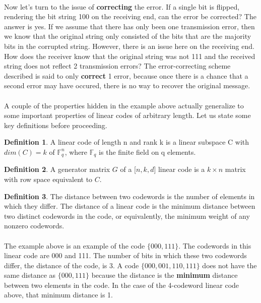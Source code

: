 \documentclass{article}
\theoremstyle{definition}
\newtheorem{definition}{Definition}[section]
\begin{document}
\paragraph{} Now let's turn to the issue of \textbf{correcting} the error.  If a single bit is flipped, rendering the bit string 100 on the receiving end, can the error be corrected?  The answer is yes.  If we assume that there has only been one transmission error, then we know that the original string only consisted of the bits that are the majority bits in the corrupted string.  However, there is an issue here on the receiving end.  How does the receiver know that the original string was not 111 and the received string does not reflect 2 transmission errors?  The error-correcting scheme described is said to only \textbf{correct} 1 error, because once there is a chance that a second error may have occured, there is no way to recover the original message. 
\paragraph{} A couple of the properties hidden in the example above actually generalize to some important properties of linear codes of arbitrary length.  Let us state some key definitions before proceeding.        

\begin{definition}
A linear code of length n and rank k is a linear subspace C with $dim(C)=k$ of $\mathbb{F}_{q}^{n}$, where $\mathbb{F}_{q}$ is the finite field on q elements. 
\end{definition}	
\begin{definition}
A generator matrix $G$ of a [$n,k,d$] linear code is a $k \times n$ matrix with row space equivalent to $C$.
\end{definition}
\begin{definition}
The distance between two codewords is the number of elements in which they differ.  The distance of a linear code is the minimum distance between two distinct codewords in the code, or equivalently, the minimum weight of any nonzero codewords.
\end{definition}

\paragraph{} The example above is an example of the code $\{000,111\}$.  The codewords in this linear code are 000 and 111.  The number of bits in which these two codewords differ, the distance of the code, is 3.  A code $\{000,001,110,111\}$ does not have the same distance as $\{000,111\}$ because the distance is the \textbf{minimum} distance between two elements in the code.  In the case of the 4-codeword linear code above, that minimum distance is 1.  
\end{document}

